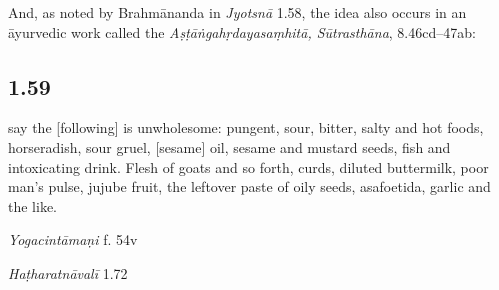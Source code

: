 \begin{ekdosis}
\begin{philcomm}[hp01_058]
And, as noted by Brahmānanda in \emph{Jyotsnā} 1.58, the idea also occurs in an āyurvedic work called the \emph{Aṣṭāṅgahṛdayasaṃhitā, Sūtrasthāna}, 8.46cd–47ab: 

\begin{versinnote}
\end{versinnote} 

\end{philcomm}

\subsection*{1.59}
\begin{translation}[hp01_059]
[Adepts] say the [following] is unwholesome: pungent, sour, bitter, salty and hot foods, horseradish, sour gruel, [sesame] oil, sesame and mustard seeds, fish and intoxicating drink. Flesh of goats and so forth, curds, diluted buttermilk, poor man's pulse, jujube fruit, the leftover paste of oily seeds, asafoetida, garlic and the like.
\end{translation}

\begin{sources}[hp01_059]
\end{sources}

\begin{testimonia}[hp01_059]
\emph{Yogacintāmaṇi} f. 54v

\begin{versinnote}
\end{versinnote}

\emph{Haṭharatnāvalī} 1.72

\begin{versinnote}
\end{versinnote}


\end{testimonia}
\end{ekdosis}
